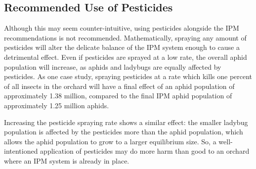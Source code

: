 \documentclass[10pt]{article}
\newcommand{\np}{\vfill\newpage}
\begin{document}
\subsection{Recommended Use of Pesticides}

Although this may seem counter-intuitive, using pesticides alongside the IPM recommendations is not recommended. Mathematically, spraying any amount of pesticides will alter the delicate balance of the IPM system enough to cause a detrimental effect. Even if pesticides are sprayed at a low rate, the overall aphid population will increase, as aphids and ladybugs are equally affected by pesticides. As one case study, spraying pesticides at a rate which kills one percent of all insects in the orchard will have a final effect of an aphid population of approximately 1.38 million, compared to the final IPM aphid population of approximately 1.25 million aphids.

Increasing the pesticide spraying rate shows a similar effect: the smaller ladybug population is affected by the pesticides more than the aphid population, which allows the aphid population to grow to a larger equilibrium size. So, a well-intentioned application of pesticides may do more harm than good to an orchard where an IPM system is already in place.

\np




\end{document}
